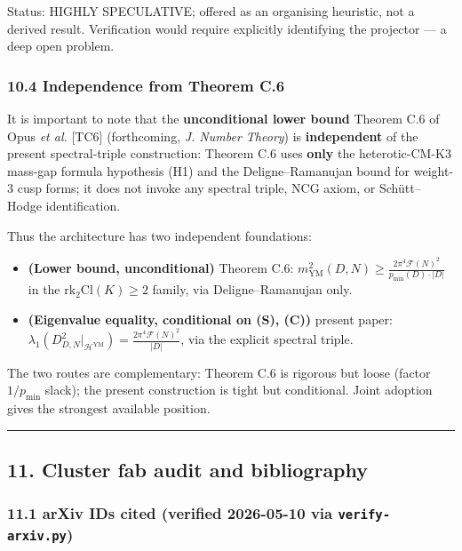 \documentclass[
  11pt,
  a4paper,
]{amsart}
\providecommand{\tightlist}{\setlength{\itemsep}{0pt}\setlength{\parskip}{0pt}}
\providecommand{\tightlist}{%
  \setlength{\itemsep}{0pt}\setlength{\parskip}{0pt}}
\begin{document}
Status: HIGHLY SPECULATIVE; offered as an organising heuristic, not a derived
result. Verification would require explicitly identifying the projector --- a
deep open problem.

\hypertarget{independence-from-theorem-c.6}{%
\subsubsection{10.4 Independence from Theorem C.6}\label{independence-from-theorem-c.6}}

It is important to note that the \textbf{unconditional lower bound} Theorem C.6 of
Opus \emph{et al.} {[}TC6{]} (forthcoming, \emph{J. Number Theory}) is \textbf{independent} of
the present spectral-triple construction: Theorem C.6 uses \textbf{only} the
heterotic-CM-K3 mass-gap formula hypothesis (H1) and the Deligne--Ramanujan
bound for weight-3 cusp forms; it does not invoke any spectral triple, NCG
axiom, or Schütt--Hodge identification.

Thus the architecture has two independent foundations:

\begin{itemize}
\tightlist
\item
  \textbf{(Lower bound, unconditional)} Theorem C.6: \(m_{\mathrm{YM}}^2(D, N) \ge \frac{2\pi^4 \mathcal{F}(N)^2}{p_{\min}(D) \cdot |D|}\)
  in the \(\mathrm{rk}_2 \mathrm{Cl}(K) \ge 2\) family, via Deligne--Ramanujan only.
\item
  \textbf{(Eigenvalue equality, conditional on (S), (C))} present paper:
  \(\lambda_1(D_{D,N}^2|_{\mathcal{H}^{\mathrm{YM}}}) = \frac{2\pi^4 \mathcal{F}(N)^2}{|D|}\),
  via the explicit spectral triple.
\end{itemize}

The two routes are complementary: Theorem C.6 is rigorous but loose (factor
\(1/p_{\min}\) slack); the present construction is tight but conditional. Joint
adoption gives the strongest available position.

\begin{center}\rule{0.5\linewidth}{0.5pt}\end{center}

\hypertarget{cluster-fab-audit-and-bibliography}{%
\subsection{11. Cluster fab audit and bibliography}\label{cluster-fab-audit-and-bibliography}}

\hypertarget{arxiv-ids-cited-verified-2026-05-10-via-verify-arxiv.py}{%
\subsubsection{\texorpdfstring{11.1 arXiv IDs cited (verified 2026-05-10 via \texttt{verify-arxiv.py})}{11.1 arXiv IDs cited (verified 2026-05-10 via verify-arxiv.py)}}\label{arxiv-ids-cited-verified-2026-05-10-via-verify-arxiv.py}}
\end{document}
